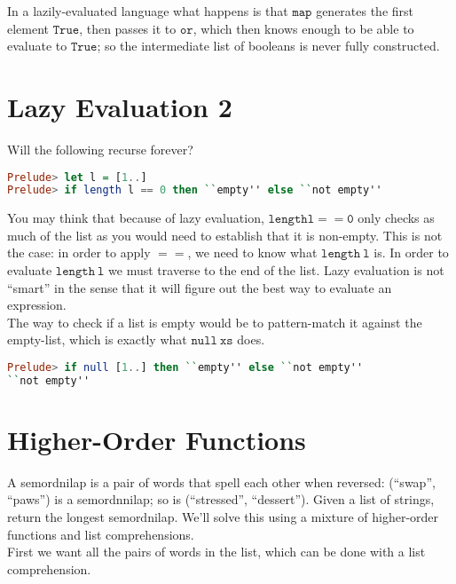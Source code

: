 \documentclass[a4paper,12pt]{article}
\newcommand{\kwa}[1]{\mathtt{#1}}
\begin{document}
\noindent
In a lazily-evaluated language what happens is that $\kwa{map}$ generates the first element $\kwa{True}$, then passes it to $\kwa{or}$, which then knows enough to be able to evaluate to $\kwa{True}$; so the intermediate list of booleans is never fully constructed.\\

\section{Lazy Evaluation 2}

\noindent
Will the following recurse forever?
\begin{lstlisting}[language=Haskell]
Prelude> let l = [1..]
Prelude> if length l == 0 then ``empty'' else ``not empty''
\end{lstlisting}

\noindent
You may think that because of lazy evaluation, $\kwa{length l == 0}$ only checks as much of the list as you would need to establish that it is non-empty. This is not the case: in order to apply $\kwa{==}$, we need to know what $\kwa{length~l}$ is. In order to evaluate $\kwa{length~l}$ we must traverse to the end of the list. Lazy evaluation is not ``smart'' in the sense that it will figure out the best way to evaluate an expression. \\

\noindent
The way to check if a list is empty would be to pattern-match it against the empty-list, which is exactly what $\kwa{null~xs}$ does.

\begin{lstlisting}[language=Haskell]
Prelude> if null [1..] then ``empty'' else ``not empty''
``not empty''
\end{lstlisting}

\section{Higher-Order Functions}

\noindent
A semordnilap is a pair of words that spell each other when reversed: (``swap'', ``paws'') is a semordnnilap; so is (``stressed'', ``dessert'').  Given a list of strings, return the longest semordnilap. We'll solve this using a mixture of higher-order functions and list comprehensions. \\

\noindent
First we want all the pairs of words in the list, which can be done with a list comprehension.
\end{document}
